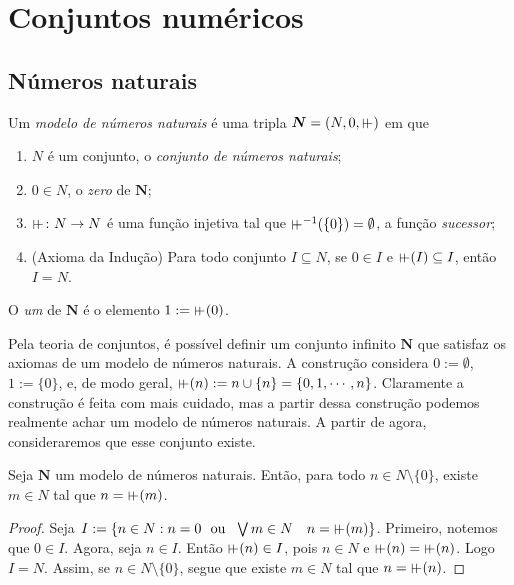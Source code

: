 \section{Conjuntos numéricos}


\subsection{Números naturais}

\begin{definition}
	Um \emph{modelo de números naturais} é uma tripla $\bm N = (N,0,\suce)$ em que
	\begin{enumerate}
	\item $N$ é um conjunto, o \emph{conjunto de números naturais};
	\item $0 \in N$, o \emph{zero} de $\bm N$;
	\item $\suce\colon N \to N$ é uma função injetiva tal que $\suce\inv(\{0\})=\emptyset$, a função \emph{sucessor};
	\item (Axioma da Indução) Para todo conjunto $I \subseteq N$, se $0 \in I$ e $\suce(I) \subseteq I$, então $I=N$.
	\end{enumerate}
O \emph{um} de $\bm N$ é o elemento $1 := \suce(0)$.
\end{definition}

Pela teoria de conjuntos, é possível definir um conjunto infinito $\bm N$ que satisfaz os axiomas de um modelo de números naturais. A construção considera $0 := \emptyset$, $1 := \{0\}$, e, de modo geral, $\suce(n) := n \cup \{n\} = \{0,1,\cdots,n\}$. Claramente a construção é feita com mais cuidado, mas a partir dessa construção podemos realmente achar um modelo de números naturais. A partir de agora, consideraremos que esse conjunto existe.

\begin{proposition}
	Seja $\bm N$ um  modelo de números naturais. Então, para todo $n \in N\setminus \{0\}$, existe $m \in N$ tal que $n=\suce(m)$.
\end{proposition}
\begin{proof}
	Seja $I := \{n \in N:n=0 \text{\ \ ou\ \ } \exists m \in N \quad n=\suce(m)\}$. Primeiro, notemos que $0 \in I$. Agora, seja $n \in I$. Então $\suce(n) \in I$, pois $n \in N$ e $\suce(n)=\suce(n)$. Logo $I=N$. Assim, se $n \in N \setminus \{0\}$, segue que existe $m \in N$ tal que $n=\suce(n)$.
\end{proof}

